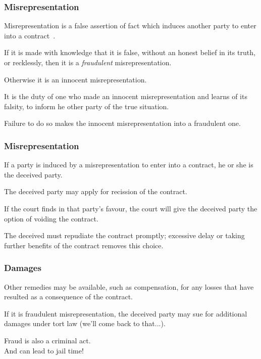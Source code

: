 \begin{frame}
\frametitle{Misrepresentation}

Misrepresentation is a false assertion of fact which induces another party to enter into a contract~\cite{lba}.

If it is made with knowledge that it is false, without an honest belief in its truth, or recklessly, then it is a \textit{fraudulent} misrepresentation.

Otherwise it is an \alert{innocent} misrepresentation. 

It is the duty of one who made an innocent misrepresentation and learns of its falsity, to inform he other party of the true situation.

Failure to do so makes the innocent misrepresentation into a fraudulent one.

\end{frame}



\begin{frame}
\frametitle{Misrepresentation}

If a party is induced by a misrepresentation to enter into a contract, he or she is the \alert{deceived party}.

The deceived party may apply for recission of the contract. 

If the court finds in that party's favour, the court will give the deceived party the option of voiding the contract.

The deceived must repudiate the contract promptly; excessive delay or taking further benefits of the contract removes this choice.

\end{frame}



\begin{frame}
\frametitle{Damages}

Other remedies may be available, such as compensation, for any losses that have resulted as a consequence of the contract.

If it is fraudulent misrepresentation, the deceived party may sue for additional damages under tort law (we'll come back to that...).

Fraud is also a criminal act.\\
\quad And can lead to jail time!

\end{frame}



